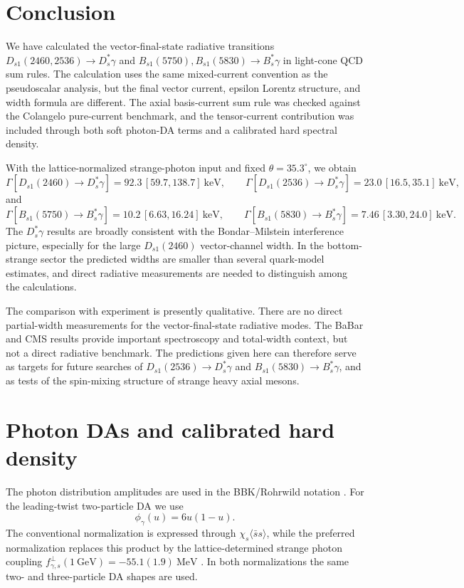 \documentclass[aps,prd,a4paper,preprint,preprintnumbers,titlepage,
nofootinbib,superscriptaddress]{revtex4-2}
\newcommand{\Dst}{D_s^\ast}
\newcommand{\Dsone}{D_{s1}}
\newcommand{\Bst}{B_s^\ast}
\newcommand{\Bsone}{B_{s1}}
\newcommand{\GeV}{\mathrm{GeV}}
\newcommand{\MeV}{\mathrm{MeV}}
\newcommand{\keV}{\mathrm{keV}}
\newcommand{\ssbar}{\langle\bar s s\rangle}
\newcommand{\fgammas}{f_{\gamma,s}^{\perp}}
\begin{document}
\section{Conclusion}
\label{sec:concl}

We have calculated the vector-final-state radiative transitions
\(\Dsone(2460,2536)\to\Dst\gamma\) and
\(B_{s1}(5750),\Bsone(5830)\to\Bst\gamma\) in light-cone QCD sum rules.  The
calculation uses the same mixed-current convention as the pseudoscalar
analysis, but the final vector current, epsilon Lorentz structure, and width
formula are different.  The axial basis-current sum rule was checked against
the Colangelo pure-current benchmark, and the tensor-current contribution was
included through both soft photon-DA terms and a calibrated hard spectral
density.

With the lattice-normalized strange-photon input and fixed
\(\theta=35.3^\circ\), we obtain
\[
  \Gamma[\Dsone(2460)\to\Dst\gamma]=92.3\,[59.7,138.7]~\keV,
\qquad
  \Gamma[\Dsone(2536)\to\Dst\gamma]=23.0\,[16.5,35.1]~\keV,
\]
and
\[
  \Gamma[B_{s1}(5750)\to\Bst\gamma]=10.2\,[6.63,16.24]~\keV,
\qquad
  \Gamma[\Bsone(5830)\to\Bst\gamma]=7.46\,[3.30,24.0]~\keV.
\]
The \(D_s^\ast\gamma\) results are broadly consistent with the
Bondar--Milstein interference picture, especially for the large
\(\Dsone(2460)\) vector-channel width.  In the bottom-strange sector the
predicted widths are smaller than several quark-model estimates, and direct
radiative measurements are needed to distinguish among the calculations.

The comparison with experiment is presently qualitative.  There are no direct
partial-width measurements for the vector-final-state radiative modes.  The
BaBar and CMS results provide important spectroscopy and total-width context,
but not a direct radiative benchmark.  The predictions given here can therefore
serve as targets for future searches of
\(\Dsone(2536)\to\Dst\gamma\) and
\(\Bsone(5830)\to\Bst\gamma\), and as tests of the spin-mixing structure of
strange heavy axial mesons.

\appendix

\section{Photon DAs and calibrated hard density}
\label{app:details}

The photon distribution amplitudes are used in the BBK/Rohrwild notation
\cite{Ball:2002ps,Rohrwild:2007yt}.  For the leading-twist two-particle DA
we use
\begin{equation}
  \phi_\gamma(u)=6u(1-u).
\end{equation}
The conventional normalization is expressed through
\(\chi_s\ssbar\), while the preferred normalization replaces this product by
the lattice-determined strange photon coupling
\(\fgammas(1~\GeV)=-55.1(1.9)~\MeV\) \cite{Bacchio:2024pij}.  In both
normalizations the same two- and three-particle DA shapes are used.
\end{document}
